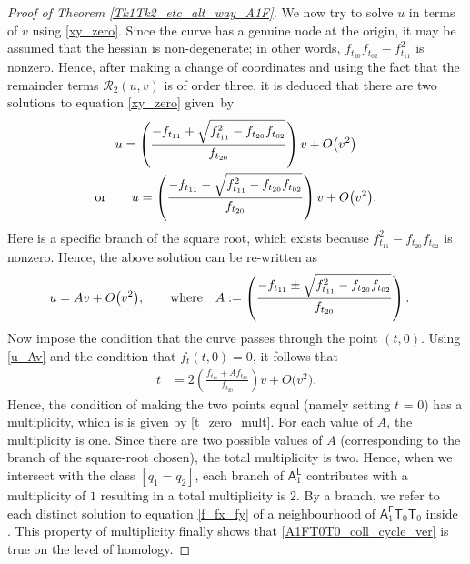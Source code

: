 \documentclass[pdftex]{sigma}
\numberwithin{equation}{section}
\begin{document}
\begin{proof}[Proof of Theorem \ref{Tk1Tk2_etc_alt_way_A1F}]
We now try to solve $u$ in terms of $v$ using \eqref{xy_zero}.
Since the curve has a genuine node at the origin, it may be assumed that the hessian is non-degenerate;
in other words, $f_{t_{20}} f_{t_{02}} - f_{t_{11}}^2$ is nonzero.
Hence, after making a change of coordinates and using the fact that the remainder terms $\mathcal{R}_2(u, v)$
is of order three, it is deduced that there are two solutions to equation \eqref{xy_zero} given~by
\begin{gather*}
u  = \left(\frac{-f_{t_{11}} + \sqrt{f_{t_{11}}^2-f_{t_{20}} f_{t_{02}}}}{ f_{t_{20}}}\right) v + O\bigl(v^2\bigr) \\
\textnormal{or} \qquad u  =
\left(\frac{-f_{t_{11}} - \sqrt{f_{t_{11}}^2-f_{t_{20}} f_{t_{02}}}}{ f_{t_{20}}}\right) v + O\bigl(v^2\bigr).
\end{gather*}
Here  is a specific branch of the square root, which exists because
$f_{t_{11}}^2-f_{t_{20}} f_{t_{02}}$ is nonzero. Hence, the above solution can be re-written as
\begin{align}
u &  =  A v + O\bigl(v^2\bigr), \qquad \textnormal{where} \quad
A := \left(\frac{-f_{t_{11}} \pm \sqrt{f_{t_{11}}^2-f_{t_{20}} f_{t_{02}}}}{ f_{t_{20}}}\right). \label{u_Av}
\end{align}
Now impose the condition that the curve passes through the point $(t, 0)$.
Using \eqref{u_Av} and the condition that $f_t(t, 0) = 0$, it follows that
\begin{align}
t&  =  2\left(\frac{f_{t_{11}} + A f_{t_{20}}}{f_{t_{20}}} \right)v + O\bigl(v^2\bigr). \label{t_zero_mult}
\end{align}
Hence, the condition of making the two points equal (namely setting $t$ = 0) has a multiplicity, which is
is given by \eqref{t_zero_mult}. For each value of $A$,
the multiplicity is one. Since there are two possible values of $A$ (corresponding to the branch of the square-root chosen),
the total multiplicity is two. Hence, when we intersect with the class $[q_1 = q_2]$, each branch of
$\mathsf{A}_1^{\mathsf{L}}$ contributes with a multiplicity of $1$ resulting in a total multiplicity is $2$. By a branch, we refer to each distinct solution to equation \eqref{f_fx_fy} of a neighbourhood of $\mathsf{A}_1^{\mathsf{F}} \mathsf{T}_{0}\mathsf{T}_{0}$ inside .
This property of multiplicity finally shows that \eqref{A1FT0T0_coll_cycle_ver} is true on the level of
homology.


\end{proof}
\end{document}
